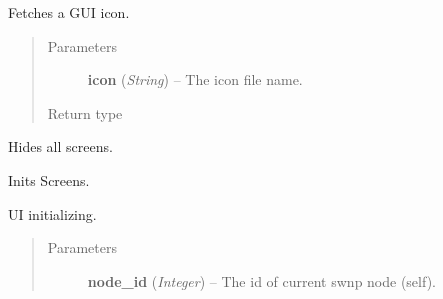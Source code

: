 \documentclass[letterpaper,10pt,english]{sphinxmanual}
\begin{document}
\begin{fulllineitems}
\begin{fulllineitems}
\end{fulllineitems}


\begin{fulllineitems}
\label{graphicaldesign:graphicaldesign.GUItemplate.GetProgramIcon}
Fetches a GUI icon.
\begin{quote}\begin{description}
\item[{Parameters}] \leavevmode
\textbf{icon} (\emph{String}) -- The icon file name.

\item[{Return type}] \leavevmode
{}

\end{description}\end{quote}

\end{fulllineitems}


\begin{fulllineitems}
\label{graphicaldesign:graphicaldesign.GUItemplate.HideScreens}
Hides all screens.

\end{fulllineitems}


\begin{fulllineitems}
\label{graphicaldesign:graphicaldesign.GUItemplate.InitScreens}
Inits Screens.

\end{fulllineitems}


\begin{fulllineitems}
\label{graphicaldesign:graphicaldesign.GUItemplate.InitUI}
UI initializing.
\begin{quote}\begin{description}
\item[{Parameters}] \leavevmode
\textbf{node\_id} (\emph{Integer}) -- The id of current swnp node (self).

\end{description}\end{quote}


\end{fulllineitems}
\end{fulllineitems}
\end{document}
